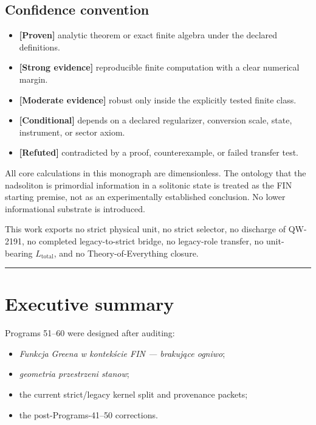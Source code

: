 \documentclass[11pt,a4paper,openany]{report}
\newcommand{\statusProven}{\textcolor{fingreen}{[Proven]}}
\newcommand{\statusStrong}{\textcolor{finblue}{[Strong evidence]}}
\newcommand{\statusModerate}{\textcolor{finviolet}{[Moderate evidence]}}
\newcommand{\statusConditional}{\textcolor{finorange}{[Conditional]}}
\newcommand{\statusRefuted}{\textcolor{finred}{[Refuted]}}
\begin{document}
\section{Confidence convention}

\begin{itemize}
\item 
\textbf{\statusProven{}} analytic theorem or exact finite algebra under the declared definitions.

\item 
\textbf{\statusStrong{}} reproducible finite computation with a clear numerical margin.

\item 
\textbf{\statusModerate{}} robust only inside the explicitly tested finite class.

\item 
\textbf{\statusConditional{}} depends on a declared regularizer, conversion scale, state, instrument, or sector axiom.

\item 
\textbf{\statusRefuted{}} contradicted by a proof, counterexample, or failed transfer test.

\end{itemize}

All core calculations in this monograph are dimensionless. The ontology that the nadsoliton is primordial information in a solitonic state is treated as the FIN starting premise, not as an experimentally established conclusion. No lower informational substrate is introduced.

This work exports no strict physical unit, no strict selector, no discharge of QW-2191, no completed legacy-to-strict bridge, no legacy-role transfer, no unit-bearing \(L_{\mathrm{total}}\), and no Theory-of-Everything closure.

\par\medskip\hrule\medskip

\chapter{Executive summary}

Programs 51–60 were designed after auditing:

\begin{itemize}
\item 
\emph{Funkcja Greena w kontekście FIN — brakujące ogniwo};

\item 
\emph{geometria przestrzeni stanow};

\item 
the current strict/\allowbreak{}legacy kernel split and provenance packets;

\item 
the post-Programs-41–50 corrections.

\end{itemize}
\end{document}
